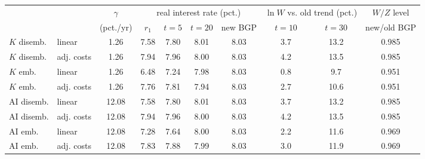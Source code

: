 \begin{tabular}{llcccccccc}\toprule
 & & $\gamma$ & \multicolumn{4}{c}{real interest rate (pct.)} & \multicolumn{2}{c}{$\ln W$ vs. old trend (pct.)} & $W/Z$ level\\
 & & (pct./yr) & $r_1$ & $t{=}5$ & $t{=}20$ & new BGP & $t{=}10$ & $t{=}30$ & new/old BGP\\\midrule
$K$ disemb. & linear & 1.26 & 7.58 & 7.80 & 8.01 & 8.03 & 3.7 & 13.2 & 0.985\\
$K$ disemb. & adj. costs & 1.26 & 7.94 & 7.96 & 8.00 & 8.03 & 4.2 & 13.5 & 0.985\\
$K$ emb. & linear & 1.26 & 6.48 & 7.24 & 7.98 & 8.03 & 0.8 & 9.7 & 0.951\\
$K$ emb. & adj. costs & 1.26 & 7.76 & 7.81 & 7.94 & 8.03 & 2.7 & 10.6 & 0.951\\
\midrule
AI disemb. & linear & 12.08 & 7.58 & 7.80 & 8.01 & 8.03 & 3.7 & 13.2 & 0.985\\
AI disemb. & adj. costs & 12.08 & 7.94 & 7.96 & 8.00 & 8.03 & 4.2 & 13.5 & 0.985\\
AI emb. & linear & 12.08 & 7.28 & 7.64 & 8.00 & 8.03 & 2.2 & 11.6 & 0.969\\
AI emb. & adj. costs & 12.08 & 7.83 & 7.88 & 7.99 & 8.03 & 3.0 & 11.9 & 0.969\\
\bottomrule\end{tabular}

